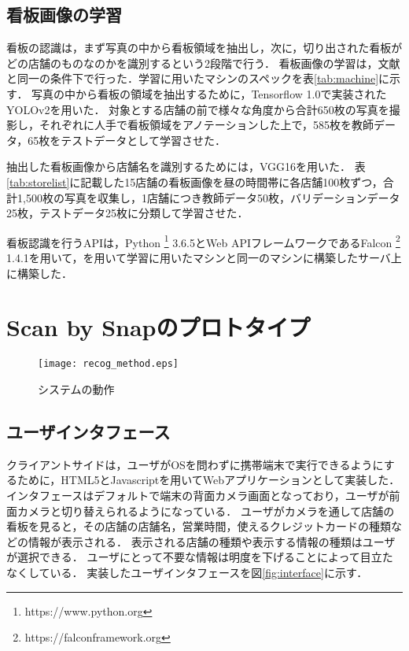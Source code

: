   \subsection{看板画像の学習}
    看板の認識は，まず写真の中から看板領域を抽出し，次に，切り出された看板がどの店舗のものなのかを識別するという2段階で行う．
    看板画像の学習は，文献\cite{Kitamura2018}と同一の条件下で行った．学習に用いたマシンのスペックを表\ref{tab:machine}に示す．
    写真の中から看板の領域を抽出するために，Tensorflow 1.0\cite{abadi2016tensorflow}で実装されたYOLOv2\cite{YOLO9000}を用いた．
    対象とする店舗の前で様々な角度から合計650枚の写真を撮影し，それぞれに人手で看板領域をアノテーションした上で，585枚を教師データ，65枚をテストデータとして学習させた．

    抽出した看板画像から店舗名を識別するためには，VGG16\cite{VGG16}を用いた．
    表\ref{tab:storelist}に記載した15店舗の看板画像を昼の時間帯に各店舗100枚ずつ，合計1,500枚の写真を収集し，1店舗につき教師データ50枚，バリデーションデータ25枚，テストデータ25枚に分類して学習させた．

    看板認識を行うAPIは，Python \footnote{https://www.python.org} 3.6.5とWeb APIフレームワークであるFalcon \footnote{https://falconframework.org} 1.4.1を用いて，を用いて学習に用いたマシンと同一のマシンに構築したサーバ上に構築した．

\section{Scan by Snapのプロトタイプ}

\begin{figure*}[t]
    \begin{center}
      \texttt{[image: recog\_method.eps]}
      \caption{システムの動作}
      \label{fig:method}
    \end{center}
  \end{figure*}

\subsection{ユーザインタフェース}
クライアントサイドは，ユーザがOSを問わずに携帯端末で実行できるようにするために，HTML5とJavascriptを用いてWebアプリケーションとして実装した．
インタフェースはデフォルトで端末の背面カメラ画面となっており，ユーザが前面カメラと切り替えられるようになっている．
ユーザがカメラを通して店舗の看板を見ると，その店舗の店舗名，営業時間，使えるクレジットカードの種類などの情報が表示される．
表示される店舗の種類や表示する情報の種類はユーザが選択できる．
ユーザにとって不要な情報は明度を下げることによって目立たなくしている．
実装したユーザインタフェースを図\ref{fig:interface}に示す．

